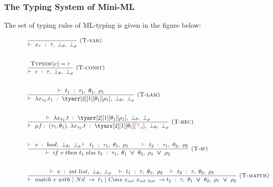 \documentclass[a4paper,11pt,oneside]{article}
\theoremstyle{plain}
\newcommand{\bvee}{\boldsymbol{~\vee~}}
\newcommand{\typing}[4]{\vdash~#1~:~#2,~#3,~#4}
\newcommand{\bth}{\bot_\theta}
\newcommand{\brh}{\bot_\rho}
\newcommand{\trh}{\top_\rho}
\begin{document}
\subsubsection{The Typing System of Mini-ML } 
	The set of typing rules of ML-typing is given in the figure below:	
\begin{figure}[H]
\begin{adjustwidth}{-0em}{-1em}
\begin{small}
\begin{minipage}[t]{0.49\linewidth}
\begin{displaymath}
\begin{array}{l}

\dfrac
	{}
	{\typing{x_{\tau}}{\tau}{\bot_{\theta}}{\bot_{\rho}}}
	{\textsc{  (T-var)}} \\[1cm]

\dfrac
	{\textsc{Typeof}(c) = \tau}
	{\typing{c}{\tau}{\bot_{\theta}}{\bot_{\rho}}}
	{\textsc{  (T-const)}} \\[1cm]

	
\dfrac
	{\typing{t_1}{\tau_1}{\theta_1}{\rho_1}}
	{\typing{\lambda x_{\tau_2} . t_1}
		{\tyarr[2][1][\theta_1][\rho_1]}{\bth}{\brh}}
	{\textsc{  (T-lam)}} \\[1cm]		
	
\dfrac
	{\typing{\lambda x_{\tau_2}. t}{\tyarr[2][1][\theta_1][\rho_1]}{\bth}{\brh}}
	{\typing{\mu f:~(\tau_1, \theta_1) .~
		\lambda x_{\tau_2}. t}
		{\tyarr[2][1][\theta_1][\textcolor{red}{\trh}]}
			{\bth}{\brh}}
	{\textsc{  (T-rec)}}\\[1cm]		
	
	\dfrac
	{
		\typing{v}{bool}{\bth}{\brh}
		\typing{t_1}{\tau_1}{\theta_1}{\rho_1} \qquad
		\typing{t_2}{\tau_1}{\theta_2}{\rho_2}
	}
	{	\typing{if~v~then~t_1~else~t_2}
		{\tau_1}{\theta_1 \bvee \theta_2}{\rho_1 \bvee \rho_2}}
	{\textsc{  (T-if)}}	\\[1cm]	
		
\dfrac
	{\typing{v}{int~list}{\bth}{\brh} \quad
	 \typing{t_1}{\tau}{\theta_1}{\rho_2}  \quad
	 \typing{t_2}{\tau}{\theta_2}{\rho_2}  }
	{\typing{match~v~with ~|~Nil~->~t_1~|~Cons~x_{int}~x_{int~list}~->t_2}{\tau}{\theta_1 \bvee \theta_2}
		{\rho_1 \bvee \rho_2}} 
{\textsc{  (T-match)}}
	
\end{array}
\end{displaymath}
\end{minipage} 
 \hfill 
\begin{minipage}[t]{0.49\linewidth}
\begin{displaymath}
\begin{array}{rrr}


\end{array}
\end{displaymath}
\end{minipage}
\end{small}
\end{adjustwidth}
\end{figure}
\end{document}
